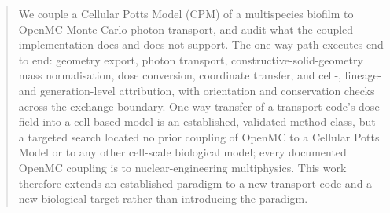 \documentclass[11pt]{article}
\begin{document}
\begin{abstract}
\noindent
We couple a Cellular Potts Model (CPM) of a multispecies biofilm to OpenMC Monte Carlo photon
transport, and audit what the coupled implementation does and does not support. The one-way path
executes end to end: geometry export, photon transport, constructive-solid-geometry mass
normalisation, dose conversion, coordinate transfer, and cell-, lineage- and generation-level
attribution, with orientation and conservation checks across the exchange boundary. One-way
transfer of a transport code's dose field into a cell-based model is an established, validated
method class, but a targeted search located no prior coupling of OpenMC to a Cellular Potts Model
or to any other cell-scale biological model; every documented OpenMC coupling is to
nuclear-engineering multiphysics. This work therefore extends an established paradigm to a new
transport code and a new biological target rather than introducing the paradigm.


\end{abstract}
\end{document}
